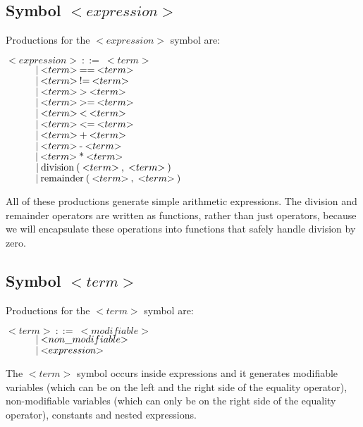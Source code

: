 \subsection{Symbol ${<}expression{>}$}
Productions for the ${<}expression{>}$ symbol are:

\noindent
$ {<}expression{>}\:::=\:{<}term{>} $\\
$ \indent\indent |\:{<}term{>}\:\text{==}\:{<}term{>} $\\
$ \indent\indent |\:{<}term{>}\:\text{!=}\:{<}term{>} $\\
$ \indent\indent |\:{<}term{>}\:\text{>}\:{<}term{>} $\\
$ \indent\indent |\:{<}term{>}\:\text{>=}\:{<}term{>} $\\
$ \indent\indent |\:{<}term{>}\:\text{<}\:{<}term{>} $\\
$ \indent\indent |\:{<}term{>}\:\text{<=}\:{<}term{>} $\\
$ \indent\indent |\:{<}term{>}\:\text{+}\:{<}term{>} $\\
$ \indent\indent |\:{<}term{>}\:\text{-}\:{<}term{>} $\\
$ \indent\indent |\:{<}term{>}\:\text{*}\:{<}term{>} $\\
$ \indent\indent |\:\text{division}\:\text{(}\:{<}term{>}\:\text{,}\:\:{<}term{>}\:\text{)} $\\
$ \indent\indent |\:\text{remainder}\:\text{(}\:{<}term{>}\:\text{,}\:\:{<}term{>}\:\text{)} $

All of these productions generate simple arithmetic expressions. The division and remainder operators are written as functions, rather than just operators, because we will encapsulate these operations into functions that safely handle division by zero.

\subsection{Symbol ${<}term{>}$}
Productions for the ${<}term{>}$ symbol are:

\noindent
$ {<}term{>}\:::=\:{<}modifiable{>} $\\
$ \indent\indent |\:{<}non\_modifiable{>} $\\
$ \indent\indent |\:{<}expression{>} $

The ${<}term{>}$ symbol occurs inside expressions and it generates modifiable variables (which can be on the left and the right side of the equality operator), non-modifiable variables (which can only be on the right side of the equality operator), constants and nested expressions.

